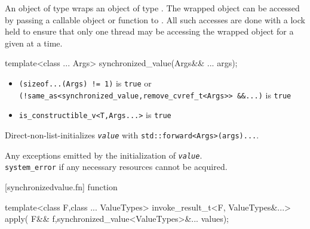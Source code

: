\pnum   
An object of type 
wraps an object of type . The wrapped object can be accessed
by passing a callable object or function to . All such
accesses are done with a lock held to ensure that only one thread may be
accessing the wrapped object for a given  at
a time.

\begin{itemdecl}

template<class ... Args>
synchronized_value(Args&& ... args);
\end{itemdecl}



\begin{itemdescr}
\pnum
\constraints
\begin{itemize}
\item 
  \texttt{(sizeof...(Args)\ !=\ 1)} is \texttt{true} or
  \texttt{(!same\_as\textless{}synchronized\_value,remove\_cvref\_t\textless{}Args\textgreater{}\textgreater{}\ \&\&...)}
  is \texttt{true}
\item
  \texttt{is\_constructible\_v\textless{}T,Args...\textgreater{}} is
  \texttt{true}
\end{itemize}
\pnum
\effects
Direct-non-list-initializes \emph{\texttt{value}} with
\texttt{std::forward\textless{}Args\textgreater{}(args)...}.

\pnum
\throws
Any exceptions emitted by the initialization of \emph{\texttt{value}}.\\
\texttt{system\_error} if any necessary resources cannot be acquired.
\end{itemdescr}


[synchronizedvalue.fn]{ function }

\begin{itemdecl}
    template<class F,class ... ValueTypes>
    invoke_result_t<F, ValueTypes&...> apply(
        F&& f,synchronized_value<ValueTypes>&... values);
\end{itemdecl}

